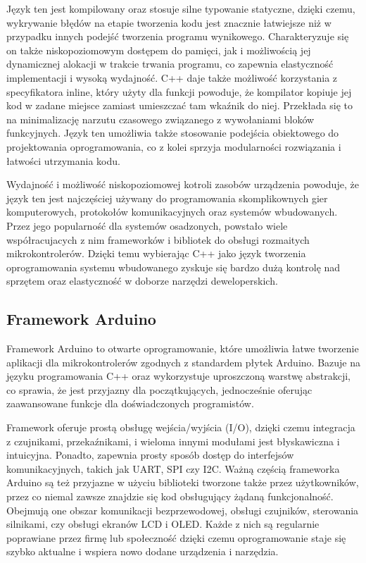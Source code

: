 \documentclass[12pt,twoside]{article}
\begin{document}
Język ten jest kompilowany oraz stosuje silne typowanie statyczne, dzięki czemu, wykrywanie błędów na etapie tworzenia kodu jest znacznie łatwiejsze niż w przypadku innych podejść tworzenia programu wynikowego. Charakteryzuje się on także niskopoziomowym dostępem do pamięci, jak i możliwością jej dynamicznej alokacji w trakcie trwania programu, co zapewnia elastyczność implementacji i wysoką wydajność. C++ daje także możliwość korzystania z specyfikatora inline, który użyty dla funkcji powoduje, że kompilator kopiuje jej kod w zadane miejsce zamiast umieszczać tam wkaźnik do niej. Przekłada się to na minimalizację narzutu czasowego związanego z wywołaniami bloków funkcyjnych. Język ten umożliwia także stosowanie podejścia obiektowego do projektowania oprogramowania, co z kolei sprzyja modularności rozwiązania i łatwości utrzymania kodu.\cite{cppBjarne}

Wydajność i możliwość niskopoziomowej kotroli zasobów urządzenia powoduje, że język ten jest  najczęściej używany do programowania skomplikownych gier
komputerowych, protokołów komunikacyjnych oraz systemów wbudowanych. Przez jego popularność dla systemów osadzonych, powstało wiele współracujacych z nim frameworków i bibliotek do obsługi rozmaitych mikrokontrolerów. Dzięki temu wybierając C++ jako język tworzenia oprogramowania systemu wbudowanego zyskuje się bardzo dużą kontrolę nad sprzętem oraz elastyczność w doborze narzędzi deweloperskich.

\subsection{Framework Arduino}
Framework Arduino\cite{arduinoIntroduction} to otwarte oprogramowanie, które umożliwia łatwe tworzenie aplikacji dla mikrokontrolerów zgodnych z standardem płytek Arduino. Bazuje na języku programowania C++ oraz wykorzystuje uproszczoną warstwę abstrakcji, co sprawia, że jest przyjazny dla początkujących, jednocześnie oferując zaawansowane funkcje dla doświadczonych programistów.

Framework oferuje prostą obsługę wejścia/wyjścia (I/O), dzięki czemu integracja z czujnikami, przekaźnikami, i wieloma innymi modułami jest błyskawiczna i intuicyjna. Ponadto, zapewnia prosty sposób dostęp do interfejsów komunikacyjnych,
takich jak UART, SPI czy I2C. Ważną częścią frameworka Arduino są też przyjazne w użyciu biblioteki tworzone także przez użytkowników, przez co niemal zawsze znajdzie się kod obsługujący żądaną funkcjonalność. Obejmują one obszar komunikacji bezprzewodowej, obsługi czujników, sterowania silnikami, czy obsługi ekranów LCD i OLED. Każde z nich są regularnie poprawiane przez firmę lub społeczność dzięki czemu oprogramowanie staje się szybko aktualne i wspiera nowo dodane urządzenia i narzędzia.
\end{document}
